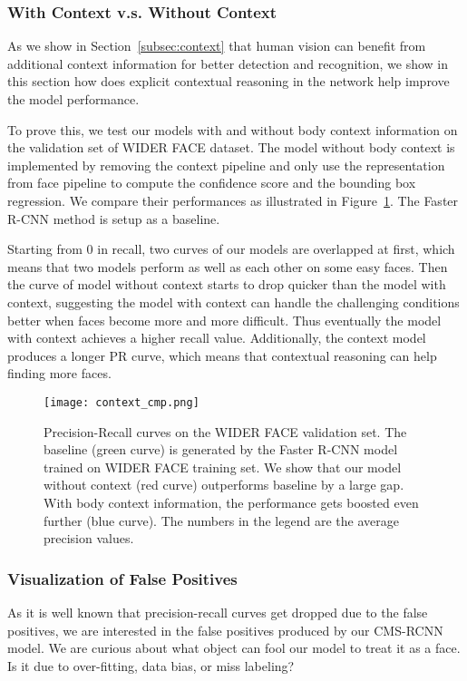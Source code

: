 \documentclass[10pt,journal,cspaper,compsoc]{IEEEtran}
\begin{document}
\subsubsection*{With Context v.s. Without Context}
As we show in Section~\ref{subsec:context} that human vision can benefit from additional context information for better detection and recognition, we show in this section how does explicit contextual reasoning in the network help improve the model performance.

To prove this, we test our models with and without body context information on the validation set of WIDER FACE dataset. The model without body context is implemented by removing the context pipeline and only use the representation from face pipeline to compute the confidence score and the bounding box regression. We compare their performances as illustrated in Figure~\ref{fig:context_compare}. The Faster R-CNN method is setup as a baseline. 

Starting from 0 in recall, two curves of our models are overlapped at first, which means that two models perform as well as each other on some easy faces. Then the curve of model without context starts to drop quicker than the model with context, suggesting the model with context can handle the challenging conditions better when faces become more and more difficult. Thus eventually the model with context achieves a higher recall value. Additionally, the context model produces a longer PR curve, which means that contextual reasoning can help finding more faces.

\begin{figure}[ht]
\centering
\texttt{[image: context\_cmp.png]}
\caption{Precision-Recall curves on the WIDER FACE validation set. The baseline (green curve) is generated by the Faster R-CNN \cite{ren2015faster} model trained on WIDER FACE training set. We show that our model without context (red curve) outperforms baseline by a large gap. With body context information, the performance gets boosted even further (blue curve). The numbers in the legend are the average precision values.}
\label{fig:context_compare}
\end{figure}

\subsubsection*{Visualization of False Positives}
As it is well known that precision-recall curves get dropped due to the false positives, we are interested in the false positives produced by our CMS-RCNN model. We are curious about what object can fool our model to treat it as a face. Is it due to over-fitting, data bias, or miss labeling?
\end{document}
